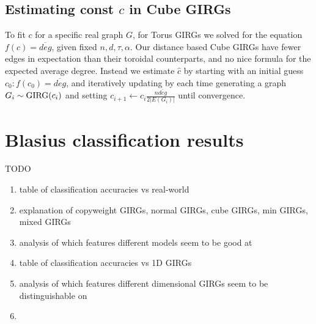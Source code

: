 \subsection{Estimating const $c$ in Cube GIRGs}
To fit $c$ for a specific real graph $G$, for Torus GIRGs we solved for the equation $f(c) = \overline{deg}$, given fixed $n, d, \tau, \alpha$. Our distance based Cube GIRGs have fewer edges in expectation than their toroidal counterparts, and no nice formula for the expected average degree. Instead we estimate $\hat{c}$ by starting with an initial guess $c_0: f(c_0) = \overline{deg}$, and iteratively updating by each time generating a graph $G_i \sim \operatorname{GIRG}(c_i)$ and setting $c_{i+1} \gets c_i \frac{n \overline{deg}}{2 |E(G_i)|}$ until convergence.

\section{Blasius classification results}
TODO
\begin{enumerate}
    \item table of classification accuracies vs real-world
    \item explanation of copyweight GIRGs, normal GIRGs, cube GIRGs, min GIRGs, mixed GIRGs
    \item analysis of which features different models seem to be good at
    \item table of classification accuracies vs 1D GIRGs
    \item analysis of which features different dimensional GIRGs seem to be distinguishable on
    \item 
\end{enumerate}




